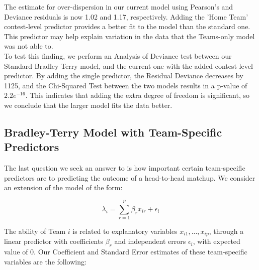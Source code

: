 \documentclass{article}
\begin{document}
The estimate for over-dispersion in our current model using Pearson's and Deviance residuals is now 1.02 and 1.17, respectively. Adding the 'Home Team' contest-level predictor provides a better fit to the model than the standard one. This predictor may help explain variation in the data that the Teams-only model was not able to.\\

To test this finding, we perform an Analysis of Deviance test between our Standard Bradley-Terry model, and the current one with the added contest-level predictor. By adding the single predictor, the Residual Deviance decreases by 1125, and the Chi-Squared Test between the two models results in a p-value of $2.2e^{-16}$. This indicates that adding the extra degree of freedom is significant, so we conclude that the larger model fits the data better.

\subsection{Bradley-Terry Model with Team-Specific Predictors}
 
 The last question we seek an answer to is how important certain team-specific predictors are to predicting the outcome of a head-to-head matchup. We consider an extension of the model of the form:
 
 $$\lambda_i = \displaystyle\sum_{r=1}^{p} \beta_r x_{ir} + \epsilon_i$$

The ability of Team $i$ is related to explanatory variables $x_{i1},...,x_{ip}$, through a linear predictor with coefficients $\beta_{r}$ and independent errors $\epsilon_i$, with expected value of 0. Our Coefficient and Standard Error estimates of these team-specific variables are the following:\\
\end{document}

